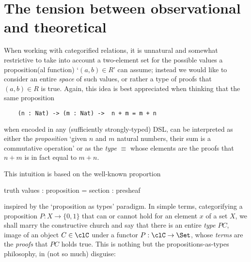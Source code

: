 \section{The tension between observational and theoretical}
\label{sec:orge11c3c4}
When working with categorified relations, it is unnatural and somewhat restrictive to take into account a two-element set for the possible values a proposition(al function) `$(a,b)\in R$' can assume; instead we would like to consider an entire \emph{space} of such values, or rather a type of proofs that $(a,b)\in R$ is true. Again, this idea is best appreciated when thinking that the same proposition 
\begin{center}
	\begin{verbatim}
	(n : Nat) -> (m : Nat) ->  n + m = m + n 
	\end{verbatim}
\end{center}
when encoded in any (sufficiently strongly-typed) DSL, can be interpreted as either the \emph{proposition} `given $n$ and $m$ natural numbers, their sum is a commutative operation' or as the \emph{type}  $\equiv$  whose elements are the proofs that $n+m$ is in fact equal to $m+n$.

This intuition is based on the well-known proportion
\begin{center}
	truth values : proposition = section : presheaf
\end{center}
inspired by the `proposition as types' paradigm. In simple terms, categorifying a proposition $P : X\to \{0,1\}$ that can or cannot hold for an element $x$ of a set $X$, we shall marry the constructive church and say that there is an entire \emph{type} $PC$, image of an object $C\in\clC$ under a functor $P : \clC \to \Set$, whose \emph{terms} are the \emph{proofs} that $PC$ holds true. This is nothing but the propositions-as-types philosophy, in (not so much) disguise: \cite{hottbook,wadler,martin1984intuitionistic}

